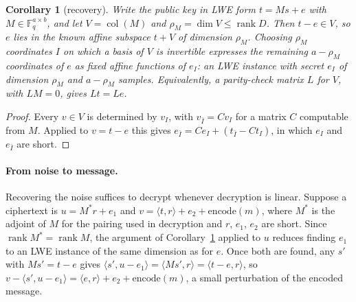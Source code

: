 \documentclass[11pt]{article}
\makeatletter
\newtheorem{corollary}{Corollary}
\theoremstyle{remark}
\newcommand{\F}{\mathbb{F}}
\DeclareMathOperator{\rank}{rank}
\DeclareMathOperator{\col}{col}
\DeclareRobustCommand{\_}{%
  \edef\@tempa{\ttdefault}%
  \ifx\f@family\@tempa\char95 \else\textunderscore\fi\penalty300\relax}
\makeatother
\begin{document}
\begin{corollary}[recovery]\label{cor:rec}
Write the public key in LWE form $t=Ms+e$ with $M\in\F_q^{a\times b}$, and let $V=\col(M)$ and $\rho_M=\dim V\le\rank D$.
Then $t-e\in V$, so $e$ lies in the known affine subspace $t+V$ of dimension $\rho_M$. Choosing $\rho_M$ coordinates $I$
on which a basis of $V$ is invertible expresses the remaining $a-\rho_M$ coordinates of $e$ as fixed affine functions of
$e_I$: an LWE instance with secret $e_I$ of dimension $\rho_M$ and $a-\rho_M$ samples. Equivalently, a parity-check
matrix $L$ for $V$, with $LM=0$, gives $Lt=Le$.
\end{corollary}

\begin{proof}
Every $v\in V$ is determined by $v_I$, with $v_{\bar I}=Cv_I$ for a matrix $C$ computable from $M$. Applied to
$v=t-e$ this gives $e_{\bar I}=Ce_I+(t_{\bar I}-Ct_I)$, in which $e_I$ and $e_{\bar I}$ are short.
\end{proof}

\paragraph{From noise to message.} Recovering the noise suffices to decrypt whenever decryption is linear. Suppose a
ciphertext is $u=M^{*}r+e_1$ and $v=\langle t,r\rangle+e_2+\mathrm{encode}(m)$, where $M^{*}$ is the adjoint of $M$ for
the pairing used in decryption and $r$, $e_1$, $e_2$ are short. Since $\rank M^{*}=\rank M$, the argument of
Corollary~\ref{cor:rec} applied to $u$ reduces finding $e_1$ to an LWE instance of the same dimension as for $e$. Once
both are found, any $s'$ with $Ms'=t-e$ gives
$\langle s',u-e_1\rangle=\langle Ms',r\rangle=\langle t-e,r\rangle$, so
$v-\langle s',u-e_1\rangle=\langle e,r\rangle+e_2+\mathrm{encode}(m)$, a small perturbation of the encoded message.
\end{document}
